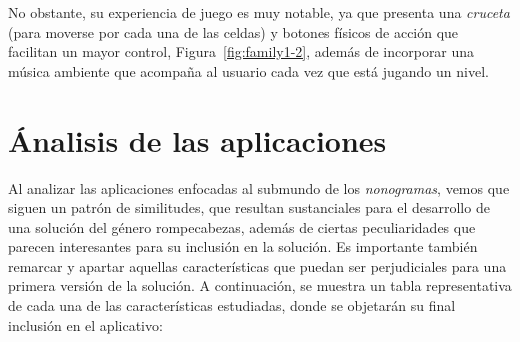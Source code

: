 \documentclass[11pt,spanish,listoffigures,listoftables]{tfgetsinf}
\begin{document}
No obstante, su experiencia de juego es muy notable, ya que presenta una \textit{cruceta} (para moverse por cada una de las celdas) 
y botones físicos de acción que facilitan un mayor control,
Figura~\ref{fig:family1-2}, además de incorporar una música ambiente que acompaña al usuario cada vez que  está jugando un nivel.

\section{Ánalisis de las aplicaciones}

Al analizar las aplicaciones enfocadas al submundo de los \textit{nonogramas}, vemos que siguen un patrón de similitudes, que resultan sustanciales 
para el desarrollo de una solución del género rompecabezas, además de ciertas peculiaridades que parecen interesantes para su inclusión en la solución.
Es importante también remarcar y apartar aquellas características que puedan ser perjudiciales para una primera versión de la solución.
A continuación, se muestra un tabla representativa de cada una de las características estudiadas, donde se objetarán su final inclusión en el aplicativo:
\end{document}
